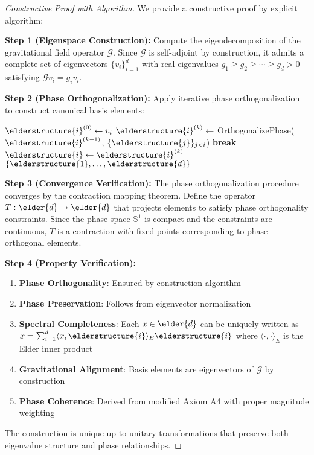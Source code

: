 \begin{proof}[Constructive Proof with Algorithm]
We provide a constructive proof by explicit algorithm:

\textbf{Step 1 (Eigenspace Construction):} 
Compute the eigendecomposition of the gravitational field operator $\mathcal{G}$. Since $\mathcal{G}$ is self-adjoint by construction, it admits a complete set of eigenvectors $\{v_i\}_{i=1}^{d}$ with real eigenvalues $g_1 \geq g_2 \geq \cdots \geq g_d > 0$ satisfying $\mathcal{G}v_i = g_i v_i$.

\textbf{Step 2 (Phase Orthogonalization):}
Apply iterative phase orthogonalization to construct canonical basis elements:
\begin{algorithm}[H]
\begin{algorithmic}[1]
        \State $\elderstructure{i}^{(0)} \leftarrow v_i$ 
            \State $\elderstructure{i}^{(k)} \leftarrow$ OrthogonalizePhase($\elderstructure{i}^{(k-1)}$, $\{\elderstructure{j}\}_{j<i}$)
                \State \textbf{break} 
            \EndIf
        \EndFor
        \State $\elderstructure{i} \leftarrow \elderstructure{i}^{(k)}$
    \EndFor
    \State \Return $\{\elderstructure{1}, \ldots, \elderstructure{d}\}$
\EndProcedure
\end{algorithmic}
\end{algorithm}

\textbf{Step 3 (Convergence Verification):}
The phase orthogonalization procedure converges by the contraction mapping theorem. Define the operator $T: \elder{d} \rightarrow \elder{d}$ that projects elements to satisfy phase orthogonality constraints. Since the phase space $\mathbb{S}^1$ is compact and the constraints are continuous, $T$ is a contraction with fixed points corresponding to phase-orthogonal elements.

\textbf{Step 4 (Property Verification):}
\begin{enumerate}
    \item \textbf{Phase Orthogonality}: Ensured by construction algorithm
    \item \textbf{Phase Preservation}: Follows from eigenvector normalization
    \item \textbf{Spectral Completeness}: Each $x \in \elder{d}$ can be uniquely written as $x = \sum_{i=1}^{d} \langle x, \elderstructure{i} \rangle_E \elderstructure{i}$ where $\langle \cdot, \cdot \rangle_E$ is the Elder inner product
    \item \textbf{Gravitational Alignment}: Basis elements are eigenvectors of $\mathcal{G}$ by construction
    \item \textbf{Phase Coherence}: Derived from modified Axiom A4 with proper magnitude weighting
\end{enumerate}

The construction is unique up to unitary transformations that preserve both eigenvalue structure and phase relationships.
\end{proof}
